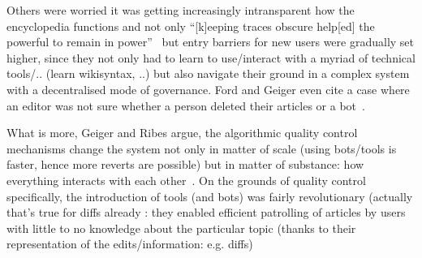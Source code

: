 Others were worried it was getting increasingly intransparent how the encyclopedia functions and not only ``[k]eeping traces obscure help[ed] the powerful to remain in power''~\cite{ForGei2012} but entry barriers for new users were gradually set higher, since they not only had to learn to use/interact with a myriad of technical tools/.. (learn wikisyntax, ..) but also navigate their ground in a complex system with a decentralised mode of governance.
Ford and Geiger even cite a case where an editor was not sure whether a person deleted their articles or a bot~\cite{ForGei2012}.

What is more, Geiger and Ribes argue, the algorithmic quality control mechanisms change the system not only in matter of scale (using bots/tools is faster, hence more reverts are possible) but in matter of substance: how everything interacts with each other~\cite{GeiRib2010}.
On the grounds of quality control specifically, the introduction of tools (and bots) was fairly revolutionary (actually that's true for diffs already %
: they enabled efficient patrolling of articles by users with little to no knowledge about the particular topic (thanks to their representation of the edits/information: e.g. diffs)

